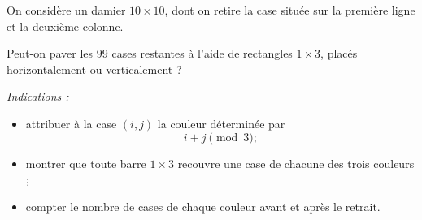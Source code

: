 On considère un damier $10 \times 10$, dont on retire la case située sur la
première ligne et la deuxième colonne.

Peut-on paver les $99$ cases restantes à l'aide de rectangles $1 \times 3$,
placés horizontalement ou verticalement ?

\emph{Indications :}
\begin{itemize}
  \item attribuer à la case $(i, j)$ la couleur déterminée par
  \[
  i + j \pmod{3} ;
  \]
  \item montrer que toute barre $1 \times 3$ recouvre une case de chacune des
  trois couleurs ;
  \item compter le nombre de cases de chaque couleur avant et après le
  retrait.
\end{itemize}
